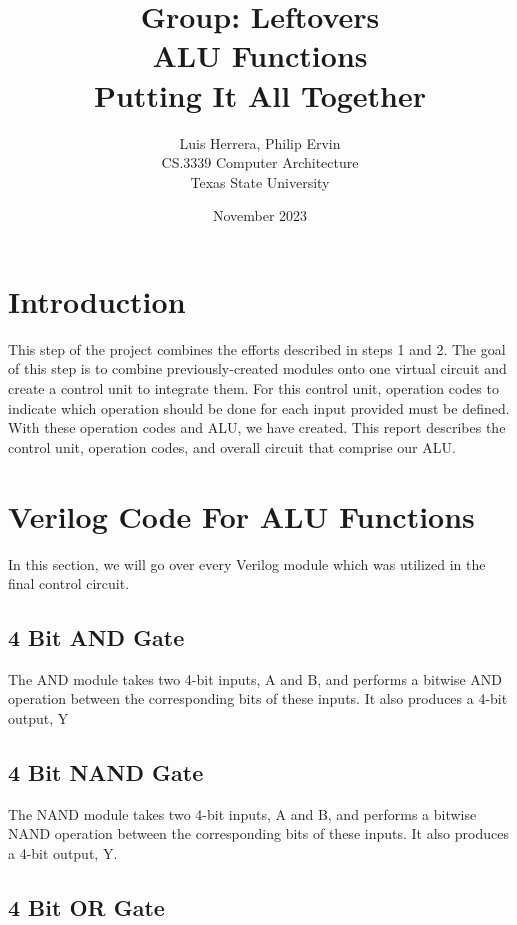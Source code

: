 \documentclass[12pt]{article}
\title{Group: Leftovers\\ALU Functions\\Putting It All Together}
\author{Luis Herrera, Philip Ervin\\
CS.3339 Computer Architecture\\
Texas State University\\
}
\date{November 2023}
\begin{document}
\maketitle


\newpage
\setcounter{page}{1}

\section{Introduction}
This step of the project combines the efforts described in steps 1 and 2. The goal of this step is to combine previously-created modules onto one virtual circuit and create a control unit to integrate them. For this control unit, operation codes to indicate which operation should be done for each input provided must be defined. With these operation codes and ALU, we have created. This report describes the control unit, operation codes, and overall circuit that comprise our ALU.

\section{Verilog Code For ALU Functions}
\label{sec:headings}

In this section, we will go over every Verilog module which was utilized in the final control circuit.

\subsection{4 Bit AND Gate}

The AND module takes two 4-bit inputs, A and B, and performs a bitwise AND operation between the corresponding bits of these inputs. It also produces a 4-bit output, Y




\subsection{4 Bit NAND Gate}

The NAND module takes two 4-bit inputs, A and B, and performs a bitwise NAND operation between the corresponding bits of these inputs. It also produces a 4-bit output, Y.



\subsection{4 Bit OR Gate}
\end{document}
